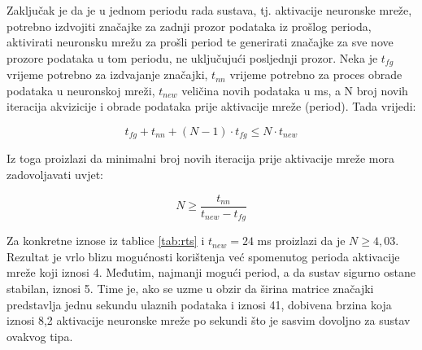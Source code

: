 Zaključak je da je u jednom periodu rada sustava, tj. aktivacije neuronske mreže, potrebno
izdvojiti značajke za zadnji prozor podataka iz prošlog perioda, aktivirati neuronsku mrežu
za prošli period te generirati značajke za sve nove prozore podataka u tom periodu, ne uključujući
posljednji prozor.
Neka je $t_{fg}$ vrijeme potrebno za izdvajanje
značajki, $t_{nn}$ vrijeme potrebno za proces obrade podataka u neuronskoj mreži,
$t_{new}$ veličina novih podataka u ms, a N broj novih iteracija akvizicije i obrade podataka
prije aktivacije mreže (period). Tada vrijedi:

\begin{equation}
    t_{fg} + t_{nn} + (N - 1) \cdot t_{fg} \leq N \cdot t_{new}
\end{equation}

Iz toga proizlazi da minimalni broj novih iteracija prije aktivacije mreže mora zadovoljavati
uvjet:

\begin{equation}
    N \geq \frac{t_{nn}}{t_{new} - t_{fg}}
\end{equation}

Za konkretne iznose iz tablice \ref{tab:rts} i $t_{new} = 24$ ms proizlazi da je 
$N \geq 4,03$. Rezultat je vrlo blizu mogućnosti korištenja već spomenutog
perioda aktivacije mreže koji iznosi 4. Međutim, najmanji mogući period, a da sustav 
sigurno ostane stabilan, iznosi 5. Time je, ako se uzme u obzir da širina matrice značajki 
predstavlja jednu sekundu ulaznih podataka i iznosi 41, dobivena brzina koja iznosi
8,2 aktivacije neuronske mreže po sekundi što je sasvim dovoljno za sustav ovakvog tipa.

